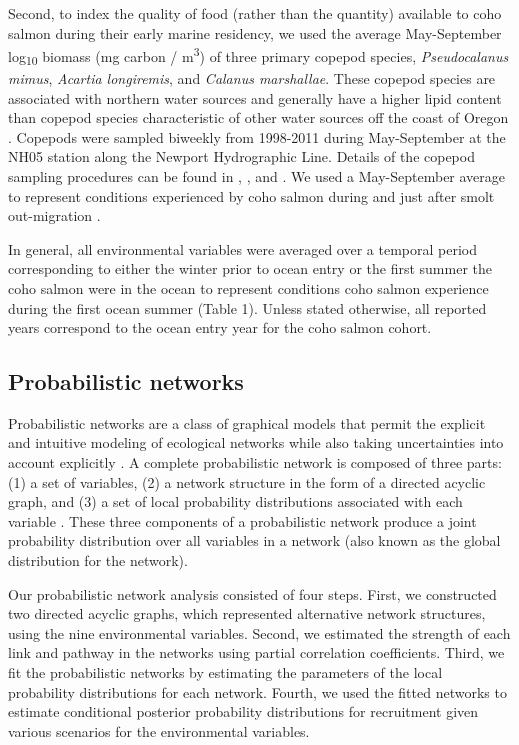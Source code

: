 Second, to index the quality of food (rather than the quantity) available to
coho salmon during their early marine residency, we used the average
May-September log\textsubscript{10} biomass (mg carbon / m\textsuperscript{3})
of three primary copepod species, \emph{Pseudocalanus mimus}, \emph{Acartia
longiremis}, and \emph{Calanus marshallae}. These copepod species are associated
with northern water sources and generally have a higher lipid content than
copepod species characteristic of other water sources off the coast of Oregon
\citep{Lee2006, Hooff2006a}. Copepods were sampled biweekly from 1998-2011
during May-September at the NH05 station along the Newport Hydrographic Line.
Details of the copepod sampling procedures can be found in \citet{Lamb2005a},
\citet{Peterson2003a}, and \citet{Bi2011b}.  We used a May-September average to
represent conditions experienced by coho salmon during and just after smolt
out-migration \citep{Bi2011a}.

In general, all environmental variables were averaged over a temporal period
corresponding to either the winter prior to ocean entry or the first summer the
coho salmon were in the ocean to represent conditions coho salmon experience
during the first ocean summer (Table 1). Unless stated otherwise, all reported
years correspond to the ocean entry year for the coho salmon cohort.


\subsection{Probabilistic networks}

Probabilistic networks are a class of graphical models that permit the explicit
and intuitive modeling of ecological networks while also taking uncertainties
into account explicitly \citep{Pearl1988a, Varis1995a}. A complete probabilistic
network is composed of three parts: (1) a set of variables, (2) a network
structure in the form of a directed acyclic graph, and (3) a set of local
probability distributions associated with each variable \citep{Heckerman1996a}.
These three components of a probabilistic network produce a joint probability
distribution over all variables in a network (also known as the global
distribution for the network).

Our probabilistic network analysis consisted of four steps. First, we
constructed two directed acyclic graphs, which represented alternative network
structures, using the nine environmental variables. Second, we estimated the
strength of each link and pathway in the networks using partial correlation
coefficients. Third, we fit the probabilistic networks by estimating the
parameters of the local probability distributions for each network. Fourth, we
used the fitted networks to estimate conditional posterior probability
distributions for recruitment given various scenarios for the environmental
variables.


